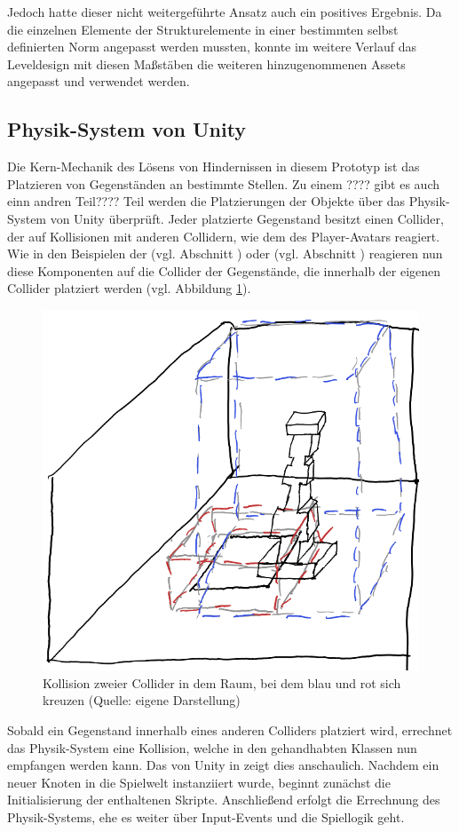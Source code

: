 Jedoch hatte dieser nicht weitergeführte Ansatz auch ein positives Ergebnis. Da die einzelnen Elemente der Strukturelemente in einer bestimmten selbst definierten Norm angepasst werden mussten, konnte im weitere Verlauf das Leveldesign mit diesen Maßstäben die weiteren hinzugenommenen Assets angepasst und verwendet werden.

\subsection{Physik-System von Unity}\label{sec:unity-physics-system}
Die Kern-Mechanik des Lösens von Hindernissen in diesem Prototyp ist das Platzieren von Gegenständen an bestimmte Stellen. Zu einem ???? gibt es auch einn andren Teil???? Teil werden die Platzierungen der Objekte über das Physik-System von Unity überprüft. Jeder platzierte Gegenstand besitzt einen Collider, der auf Kollisionen mit anderen Collidern, wie dem des Player-Avatars reagiert. Wie in den Beispielen der  (vgl. Abschnitt ) oder  (vgl. Abschnitt ) reagieren nun diese Komponenten auf die Collider der Gegenstände, die innerhalb der eigenen Collider platziert werden (vgl. Abbildung \ref{fig:collision-sketch}). 

\begin{figure}[ht]
\centering
\includegraphics[width=.6\linewidth]{content/pictures/CollisionSketch.png}
\caption{Kollision zweier Collider in dem Raum, bei dem blau und rot sich kreuzen (Quelle: eigene Darstellung)}
\label{fig:collision-sketch}
\end{figure}


Sobald ein Gegenstand innerhalb eines anderen Colliders platziert wird, errechnet das Physik-System eine Kollision, welche in den gehandhabten Klassen nun empfangen werden kann. Das  von Unity in \cite{technologies_unity_nodate} zeigt dies anschaulich. Nachdem ein neuer Knoten in die Spielwelt instanziiert wurde, beginnt zunächst die Initialisierung der enthaltenen Skripte. Anschließend erfolgt die Errechnung des Physik-Systems, ehe es weiter über Input-Events und die Spiellogik geht.

